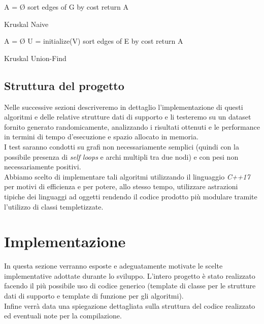 \documentclass[]{article}
\begin{document}
\begin{algorithm}[H]
	\SetAlgoLined
	\DontPrintSemicolon
	A = Ø\;
	sort edges of G by cost\;
	return A\;
	\caption{Kruskal Naive}
\end{algorithm}

\begin{algorithm}[H]
	\SetAlgoLined
	\DontPrintSemicolon
	A = Ø\;
	U = initialize(V)\;
	sort edges of E by cost\;
	return A\;
	\caption{Kruskal Union-Find}
\end{algorithm}
\subsection{Struttura del progetto}
Nelle successive sezioni descriveremo in dettaglio l'implementazione di questi algoritmi e delle relative strutture dati di supporto e li testeremo su un dataset fornito generato randomicamente, analizzando i risultati ottenuti e le performance in termini di tempo d'esecuzione e spazio allocato in memoria.\\
I test saranno condotti su grafi non necessariamente semplici (quindi con la possibile presenza di \textit{self loops} e archi multipli tra due nodi) e con pesi non necessariamente positivi.\\
Abbiamo scelto di implementare tali algoritmi utilizzando il linguaggio \textit{C++17} per motivi di efficienza e per potere, allo stesso tempo, utilizzare astrazioni tipiche dei linguaggi ad oggetti rendendo il codice prodotto più modulare tramite l'utilizzo di classi templetizzate.
\section{Implementazione}
In questa sezione verranno esposte e adeguatamente motivate le scelte implementative adottate durante lo sviluppo. L'intero progetto è stato realizzato facendo il più possibile uso di codice generico (template di classe per le strutture dati di supporto e template di funzione per gli algoritmi).\\
Infine verrà data una spiegazione dettagliata sulla struttura del codice realizzato ed eventuali note per la compilazione.
\end{document}
